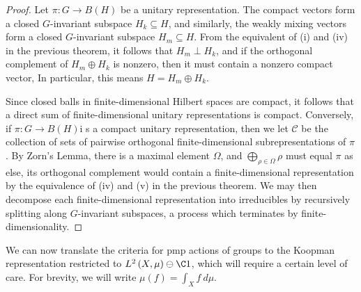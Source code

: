 \documentclass[10pt]{mypackage}
\begin{document}
\begin{proof}
  Let $\pi\colon G\rightarrow B\left( H \right)$ be a unitary representation. The compact vectors form a closed $G$-invariant subspace $H_{k}\subseteq H$, and similarly, the weakly mixing vectors form a closed $G$-invariant subspace $H_{m}\subseteq H$. From the equivalent of (i) and (iv) in the previous theorem, it follows that $H_m\perp H_k$, and if the orthogonal complement of $H_{m}\oplus H_k$ is nonzero, then it must contain a nonzero compact vector, In particular, this means $H = H_m\oplus H_k$.

  Since closed balls in finite-dimensional Hilbert spaces are compact, it follows that a direct sum of finite-dimensional unitary representations is compact. Conversely, if $\pi\colon G\rightarrow B(H)$i s a compact unitary representation, then we let $\mathcal{C}$ be the collection of sets of pairwise orthogonal finite-dimensional subrepresentations of $\pi$. By Zorn's Lemma, there is a maximal element $\Omega$, and $\bigoplus_{\rho\in\Omega}\rho$ must equal $\pi$ as else, its orthogonal complement would contain a finite-dimensional representation by the equivalence of (iv) and (v) in the previous theorem. We may then decompose each finite-dimensional representation into irreducibles by recursively splitting along $G$-invariant subspaces, a process which terminates by finite-dimensionality.
\end{proof}
We can now translate the criteria for pmp actions of groups to the Koopman representation restricted to $L^2\left( X,\mu \right)\ominus \C 1$, which will require a certain level of care. For brevity, we will write $\mu(f) = \int_{X}^{} f\:d\mu$.
\end{document}
